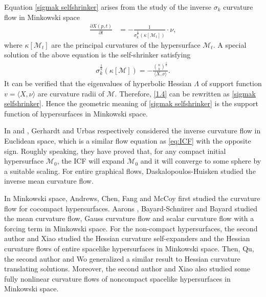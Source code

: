 \documentclass[reqno]{amsart}
\theoremstyle{remark}
\theoremstyle{definition}
\numberwithin{equation}{section}
\begin{document}
Equation \eqref{sigmak selfshrinker} arises from the study of the inverse $\sigma_k$ curvature flow in Minkowski space 
\begin{align}\label{eq:ICF}
    \frac{\partial X (p, t)}{\partial t} &= -\frac{1}{\sigma_k^{\frac{1}{k}}(\kappa\left[ \mathcal{M}_t \right])} \cdot \nu,
\end{align}
where $\kappa\left[ \mathcal{M}_t \right]$ are the principal curvatures of the hypersurface $\mathcal{M}_t$.
A special solution of the above equation is the self-shrinker satisfying  
\begin{align}\label{1.4}
    \sigma_k^\frac{1}{k}(\kappa\left[ \mathcal{M} \right]) = - \frac{\binom{n}{k}^{\frac{1}{k}}}{\langle X, \nu \rangle}.
\end{align}
It can be verified that the eigenvalues of hyperbolic Hessian $\Lambda$ of support function $v = \langle X, \nu \rangle$ are curvature radii of $\mathcal{M}$. Therefore, \eqref{1.4} can be rewritten as \eqref{sigmak selfshrinker}. Hence the geometric meaning of \eqref{sigmak selfshrinker} is the support function of hypersurfaces in Minkowski space.


In \cite{Ger} and \cite{Ur}, Gerhardt and Urbas respectively considered the inverse curvature flow in Euclidean space, which is a similar flow equation as \eqref{eq:ICF} with the opposite sign. Roughly speaking, they have proved that, for any compact initial hypersurface $\mathcal{M}_0$, the ICF will expand $\mathcal{M}_0$ and it will converge to some sphere by a suitable scaling. For entire graphical flows, Daskalopoulos-Huisken \cite{DH} studied the inverse mean curvature flow. 

In Minkowski space, Andrews, Chen, Fang and McCoy \cite{co-compact} first studied the curvature flow for cocompact hypersurfaces.  Aarons \cite{Aa}, Bayard-Schn\"{u}rer \cite{BayardSchnürer} and Bayard \cite{B09} studied the mean curvature flow, Gauss curvature flow and scalar curvature flow with a forcing term in Minkowski space. For the non-compact hypersurfaces, the second author and Xiao \cite{Entireself-expanders, Entiresigmakcurvatureflow} studied the Hessian curvature self-expanders and the Hessian curvature flows of entire spacelike hypersurfaces in Minkowski space. Then, Qu, the second author and Wo \cite{QWW24}  generalized a similar result to Hessian curvature translating solutions. Moreover, the second author and Xiao \cite{Entireconvexcurvatureflow} also studied some fully nonlinear curvature flows of noncompact spacelike hypersurfaces in Minkowski space. 
\end{document}
